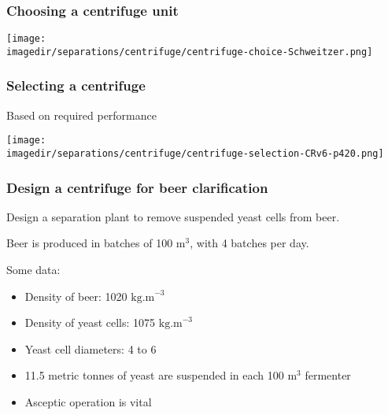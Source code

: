 \begin{frame}\frametitle{Choosing a centrifuge unit}
	\begin{center}
		\texttt{[image: \\imagedir/separations/centrifuge/centrifuge-choice-Schweitzer.png]}
	\end{center}
\end{frame}

\begin{frame}\frametitle{Selecting a centrifuge}
	Based on required performance
	\begin{center}
		\texttt{[image: \\imagedir/separations/centrifuge/centrifuge-selection-CRv6-p420.png]}
	\end{center}
\end{frame}

\begin{frame}\frametitle{Design a centrifuge for beer clarification}
	Design a separation plant to remove suspended yeast cells from beer.

	\vspace{12pt}
	Beer is produced in batches of 100 $\text{m}^3$, with 4 batches per day.

	\vspace{12pt}
	Some data:
	\begin{itemize}
		\item	Density of beer: 1020 $\text{kg.m}^{-3}$
		\item	Density of yeast cells: 1075 $\text{kg.m}^{-3}$
		\item	Yeast cell diameters: 4 to 6 \micron
		\item	11.5 metric tonnes of yeast are suspended in each 100 $\text{m}^3$ fermenter
		\item	Asceptic operation is vital
	\end{itemize}
\end{frame}

